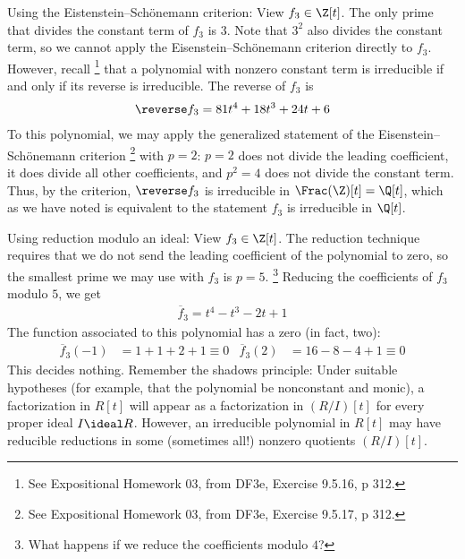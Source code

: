 {Using the Eistenstein--Sch\"{o}nemann criterion: View $f_{3} \in \Z[t]$. The only prime that divides the constant term of $f_{3}$ is $3$. Note that $3^{2}$ also divides the constant term, so we cannot apply the Eisenstein--Sch\"{o}nemann criterion directly to $f_{3}$. However, recall%
\footnote{See Expositional Homework 03, from DF3e, Exercise 9.5.16, p 312.} %
that a polynomial with nonzero constant term is irreducible if and only if its reverse is irreducible. The reverse of $f_{3}$ is
\begin{align*}
\reverse f_{3}
=
81 t^{4} + 18 t^{3} + 24 t + 6
\end{align*}
To this polynomial, we may apply the generalized statement of the Eisenstein--Sch\"{o}nemann criterion%
\footnote{See Expositional Homework 03, from DF3e, Exercise 9.5.17, p 312.} %
with $p = 2$: $p = 2$ does not divide the leading coefficient, it does divide all other coefficients, and $p^{2} = 4$ does not divide the constant term. Thus, by the criterion, $\reverse f_{3}$ is irreducible in $\Frac(\Z)[t] = \Q[t]$, which as we have noted is equivalent to the statement $f_{3}$ is irreducible in $\Q[t]$.

Using reduction modulo an ideal: View $f_{3} \in \Z[t]$. The reduction technique requires that we do not send the leading coefficient of the polynomial to zero, so the smallest prime we may use with $f_{3}$ is $p = 5$.%
\footnote{What happens if we reduce the coefficients modulo $4$?} %
Reducing the coefficients of $f_{3}$ modulo $5$, we get
\begin{align*}
\overline{f}_{3}
=
t^{4} - t^{3} - 2 t + 1
\end{align*}
The function associated to this polynomial has a zero (in fact, two):
\begin{align*}
\overline{f}_{3}(-1)
&=
1 + 1 + 2 + 1
\equiv
0
&
\overline{f}_{3}(2)
&=
16 - 8 - 4 + 1
\equiv
0
\end{align*}
This decides nothing. Remember the shadows principle: Under suitable hypotheses (for example, that the polynomial be nonconstant and monic), a factorization in $R[t]$ will appear as a factorization in $(R / I)[t]$ for every proper ideal $I \ideal R$. However, an irreducible polynomial in $R[t]$ may have reducible reductions in some (sometimes all!) nonzero quotients $(R / I)[t]$.

}
